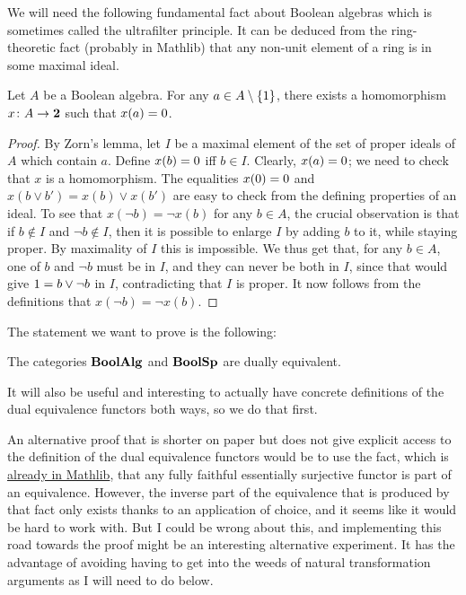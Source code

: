 \documentclass[a4paper]{article}
\begin{document}
We will need the following fundamental fact about Boolean algebras which is
sometimes called the ultrafilter principle. It can be deduced from the
ring-theoretic fact (probably in Mathlib) that any non-unit element of a ring
is in some maximal ideal.
\begin{lemma}\label{ultrafilterprinciple}
    Let $A$ be a Boolean algebra. For any $a \in A \setminus \{1\}$, 
    there exists a homomorphism $x \colon A \to \mathbf{2}$ such that $x(a) =
    0$.
\end{lemma}
\begin{proof}
    By Zorn's lemma, let $I$ be a maximal element of the set of proper ideals of $A$
    which contain $a$. Define $x(b) = 0$ iff $b \in I$. Clearly, $x(a) =
    0$; we need to check that $x$ is a homomorphism. 
The equalities $x(0) = 0$ and $x(b \vee b') = x(b) \vee x(b')$ are
    easy to check from the defining properties of an ideal. To see that $x(\neg
    b) = \neg x(b)$ for any $b \in A$, the crucial observation is that if $b
    \not\in I$ and $\neg b \not\in I$, then it is possible to enlarge $I$ by
    adding $b$ to it, while staying proper. By maximality of $I$ this is
    impossible.  We thus get that, for any $b \in A$, one of $b$ and $\neg b$
    must be in $I$, and they can never be both in $I$, since that would give
    $1 = b \vee \neg b$ in $I$, contradicting that $I$ is proper. It now
    follows from the definitions that $x(\neg b) = \neg x(b)$.
\end{proof}
The statement we want to prove is the following:
\begin{theorem}\label{BABoolSpdualeq}
    The categories $\mathbf{BoolAlg}$ and $\mathbf{BoolSp}$ are dually equivalent.
\end{theorem}
It will also be useful and interesting to actually have concrete definitions of
the dual equivalence functors both ways, so we do that first.
\begin{remark}
An alternative proof that is shorter on paper but does not give explicit access
to the definition of the dual equivalence functors would be to use the
fact, which is 
\href{https://leanprover-community.github.io/mathlib4_docs/Mathlib/CategoryTheory/Equivalence.html#CategoryTheory.Equivalence.ofFullyFaithfullyEssSurj}{already
in Mathlib}, that any fully faithful essentially surjective functor is part
of an equivalence. However, the inverse part of the equivalence that is
produced by that fact only exists thanks to an application of choice, and it
seems like it would be hard to work with. But I could be wrong about this, and
implementing this road towards the proof might be an interesting alternative experiment. It
has the advantage of avoiding having to get into the weeds of natural
transformation arguments as I will need to do below.
\end{remark}
\end{document}
